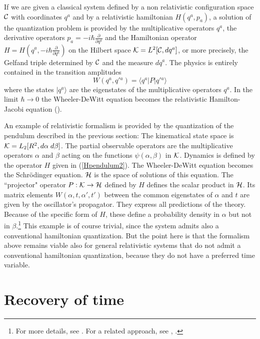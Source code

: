 \documentclass[10pt,nofootinbib]{revtex4}
\begin{document}
If we are given a classical system defined by a non relativistic 
configuration space ${\cal C}$ with coordinates $q^a$ and by a 
relativistic hamiltonian $H(q^a,p_{a})$, a solution of the quantization 
problem is provided by the multiplicative operators $q^a$, the derivative 
operators 
$ p_{a}=-i\hbar\frac{\partial}{\partial q^a}
$
and the 
Hamiltonian operator 
$       H= H\left(q^a,-i\hbar\frac{\partial}{\partial q^a}\right) 
$ on the Hilbert space ${\cal K}=L^2[{\cal C},dq^a]$, or more precisely,
the Gelfand triple determined by $\cal C$ and the measure $dq^a$.  The
physics is entirely contained in the transition amplitudes
\begin{equation} 
        W(q^a,q'{}^a)=\langle q^a| P|q'{}^a\rangle 
\end{equation} 
where the 
states $|q^a\rangle$ are the eigenstates of the multiplicative operators 
$q^a$. 
In the limit $\hbar\to 0$ the Wheeler-DeWitt equation becomes the
relativistic Hamilton-Jacobi equation (\cite{book}). 
 
An example of relativistic formalism is provided
by the quantization of the pendulum described in the previous section:
The kinematical state space is ${\cal K}=L_{2}[R^2,d\alpha\; d\beta]$.  The
partial observable operators are the multiplicative operators $\alpha$
and $\beta$ acting on the functions $\psi(\alpha,\beta)$ in ${\cal K}$. 
Dynamics is defined by the operator $H$ given in (\ref{Hpendulum2}). 
The Wheeler-DeWitt equation becomes the Schr\"odinger equation. 
$\cal H$ is the space of solutions of this equation.  The ``projector"
operator $P: {\cal K}\to {\cal H}$ defined by $H$ defines the scalar 
product in $\cal H$.  Its matrix
elements $W(\alpha,t,\alpha',t')$ between the common eigenstates of
$\alpha$ and $t$ are given by the oscillator's propagator.  They
express all predictions of the theory.  Because of the specific form
of $H$, these define a probability density in $\alpha$ but not in $\beta$.\footnote{
For more details, see \cite{book}. For a related approach, see 
\cite{hartle}, \cite{Halliwell}.} This example is of course trivial, since the system admits
also a conventional hamiltonian quantization.   But the point here is that the
formalism above remains viable also for general relativistic systems that do 
not admit a conventional hamiltonian quantization, because they do not have 
a preferred time variable.  

\section{Recovery of time}
\end{document}
